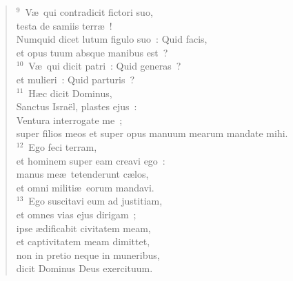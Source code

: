 \begin{flushleft}\begin{verse}${}^{9}$~V\ae\ qui contradicit fictori suo,\\ testa de samiis terr\ae~!\\ Numquid dicet lutum figulo suo~: Quid facis,\\ et opus tuum absque manibus est~?\\
${}^{10}$~V\ae\ qui dicit patri~: Quid generas~?\\ et mulieri~: Quid parturis~?\\
${}^{11}$~H\ae c dicit Dominus,\\ Sanctus Isra\"el, plastes ejus~:\\ Ventura interrogate me~;\\ super filios meos et super opus manuum mearum mandate mihi.\\
${}^{12}$~Ego feci terram,\\ et hominem super eam creavi ego~:\\ manus me\ae\ tetenderunt c\ae los,\\ et omni militi\ae\ eorum mandavi.\\
${}^{13}$~Ego suscitavi eum ad justitiam,\\ et omnes vias ejus dirigam~;\\ ipse \ae dificabit civitatem meam,\\ et captivitatem meam dimittet,\\ non in pretio neque in muneribus,\\ dicit Dominus Deus exercituum.\end{verse}\end{flushleft}


